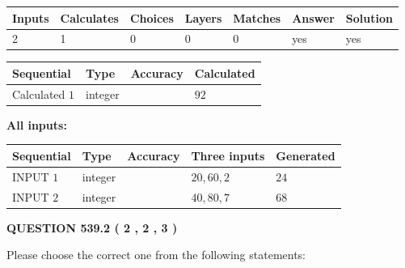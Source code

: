 \documentclass[12pt]{article}
\begin{document}
 
\noindent{}
 
 

 
   
   
   
   
\noindent\begin{tabular}{|l|l|l|l|l|l|l|}
 \hline
Inputs & Calculates & Choices & Layers & Matches & Answer & Solution \\ \hline
 2  & 
 1  & 
 0
  & 
 0  & 
 0  & 
  yes & 
  yes 
  \\ \hline
 \end{tabular}
   
   
   
   
\noindent{}
   
   
  
  
\noindent\begin{tabular}{|l|l|l|l|}
\hline
 Sequential & Type & Accuracy & Calculated \\ 
\hline
 
 
  Calculated $  1 $ & integer &  & 
  $ 92 $ 
 \\  \hline  
 \end{tabular}
   
   
   
   
\noindent\vspace{0.1in}\hspace{-0.08in} {\textbf{\Large{All inputs: }}}
   
   
  
  
\noindent\begin{tabular}{|l|l|l|l|l|}
\hline
 Sequential & Type & Accuracy & Three inputs & Generated \\ 
\hline
 
 
  INPUT $  1 $ & integer &  & $
 20
 , 
 60
 , 
 2
 $ & $ 24 $ 
 \\  \hline  
 
 
  INPUT $  2 $ & integer &  & $
 40
 , 
 80
 , 
 7
 $ & $ 68 $ 
 \\  \hline  
 \end{tabular}
   
   
  
\vspace{0.2in}
  
{\textbf{\Large{QUESTION
539.2 
 ( 2 , 2 , 3 )
}}}
  
  
Please choose the correct one from the following statements:
 
\end{document}
